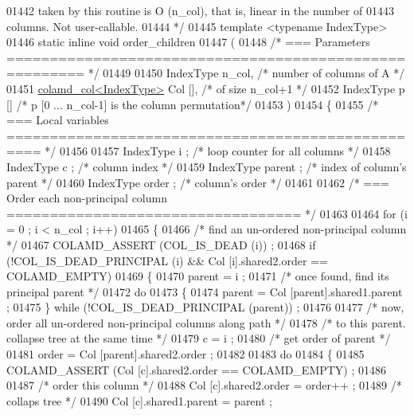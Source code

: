 \begin{DoxyCode}
{{{{{{{{{{{{{{{{{{{{{{{{{{{{01442 \textcolor{comment}{  taken by this routine is O (n\_col), that is, linear in the number of}
01443 \textcolor{comment}{  columns.  Not user-callable.}
01444 \textcolor{comment}{*/}
01445 \textcolor{keyword}{template} <\textcolor{keyword}{typename} IndexType>
01446 \textcolor{keyword}{static} \textcolor{keyword}{inline}  \textcolor{keywordtype}{void} order\_children
01447 (
01448   \textcolor{comment}{/* === Parameters ======================================================= */}
01449 
01450   IndexType n\_col,      \textcolor{comment}{/* number of columns of A */}
01451   \hyperlink{structinternal_1_1colamd__col}{colamd\_col<IndexType>} Col [],    \textcolor{comment}{/* of size n\_col+1 */}
01452   IndexType p []      \textcolor{comment}{/* p [0 ... n\_col-1] is the column permutation*/}
01453   )
01454 \{
01455   \textcolor{comment}{/* === Local variables ================================================== */}
01456 
01457   IndexType i ;     \textcolor{comment}{/* loop counter for all columns */}
01458   IndexType c ;     \textcolor{comment}{/* column index */}
01459   IndexType parent ;    \textcolor{comment}{/* index of column's parent */}
01460   IndexType order ;     \textcolor{comment}{/* column's order */}
01461 
01462   \textcolor{comment}{/* === Order each non-principal column ================================== */}
01463 
01464   \textcolor{keywordflow}{for} (i = 0 ; i < n\_col ; i++)
01465   \{
01466     \textcolor{comment}{/* find an un-ordered non-principal column */}
01467     COLAMD\_ASSERT (COL\_IS\_DEAD (i)) ;
01468     \textcolor{keywordflow}{if} (!COL\_IS\_DEAD\_PRINCIPAL (i) && Col [i].shared2.order == COLAMD\_EMPTY)
01469     \{
01470       parent = i ;
01471       \textcolor{comment}{/* once found, find its principal parent */}
01472       \textcolor{keywordflow}{do}
01473       \{
01474     parent = Col [parent].shared1.parent ;
01475       \} \textcolor{keywordflow}{while} (!COL\_IS\_DEAD\_PRINCIPAL (parent)) ;
01476 
01477       \textcolor{comment}{/* now, order all un-ordered non-principal columns along path */}
01478       \textcolor{comment}{/* to this parent.  collapse tree at the same time */}
01479       c = i ;
01480       \textcolor{comment}{/* get order of parent */}
01481       order = Col [parent].shared2.order ;
01482 
01483       \textcolor{keywordflow}{do}
01484       \{
01485     COLAMD\_ASSERT (Col [c].shared2.order == COLAMD\_EMPTY) ;
01486 
01487     \textcolor{comment}{/* order this column */}
01488     Col [c].shared2.order = order++ ;
01489     \textcolor{comment}{/* collaps tree */}
01490     Col [c].shared1.parent = parent ;
}}}}}}}}}}}}}}}}}}}}}}}}}}}}
\end{DoxyCode}
